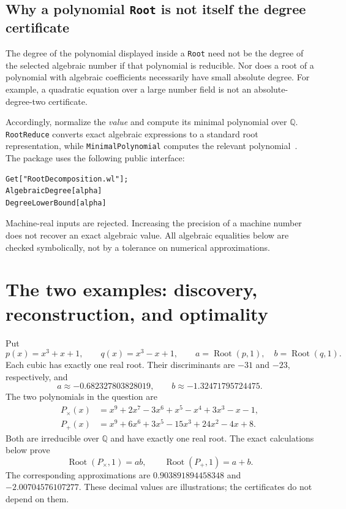 \documentclass[11pt,letterpaper]{article}
\theoremstyle{definition}\newtheorem{definition}[theorem]{Definition}
\theoremstyle{remark}\newtheorem{remark}[theorem]{Remark}
\newcommand{\Q}{\mathbb Q}
\newcommand{\WL}[1]{\texttt{#1}}
\begin{document}
\subsection{Why a polynomial \texttt{Root} is not itself the degree certificate}
The degree of the polynomial displayed inside a \WL{Root} need not be the degree of the selected algebraic number if that polynomial is reducible. Nor does a root of a polynomial with algebraic coefficients necessarily have small absolute degree. For example, a quadratic equation over a large number field is not an absolute-degree-two certificate.

Accordingly, normalize the \emph{value} and compute its minimal polynomial over $\Q$. \WL{RootReduce} converts exact algebraic expressions to a standard root representation, while \WL{MinimalPolynomial} computes the relevant polynomial~\cite{rootreduce,minpoly}. The package uses the following public interface:
\begin{lstlisting}
Get["RootDecomposition.wl"];
AlgebraicDegree[alpha]
DegreeLowerBound[alpha]
\end{lstlisting}
Machine-real inputs are rejected. Increasing the precision of a machine number does not recover an exact algebraic value. All algebraic equalities below are checked symbolically, not by a tolerance on numerical approximations.

\section{The two examples: discovery, reconstruction, and optimality}
\label{sec:examples}
Put
\begin{equation}
 p(x)=x^3+x+1,\qquad q(x)=x^3-x+1,
 \qquad a=\operatorname{Root}(p,1),\quad b=\operatorname{Root}(q,1).
 \label{eq:cubics}
\end{equation}
Each cubic has exactly one real root. Their discriminants are $-31$ and $-23$, respectively, and
\[
 a\approx-0.682327803828019,\qquad
 b\approx-1.32471795724475.
\]
The two polynomials in the question are
\begin{align}
 P_\times(x)&=x^9+2x^7-3x^6+x^5-x^4+3x^3-x-1,\label{eq:pm}\\
 P_+(x)&=x^9+6x^6+3x^5-15x^3+24x^2-4x+8.\label{eq:ps}
\end{align}
Both are irreducible over $\Q$ and have exactly one real root. The exact calculations below prove
\begin{equation}
 \operatorname{Root}(P_\times,1)=ab,
 \qquad
 \operatorname{Root}(P_+,1)=a+b.
 \label{eq:answers}
\end{equation}
The corresponding approximations are $0.903891894458348$ and $-2.00704576107277$. These decimal values are illustrations; the certificates do not depend on them.
\end{document}
